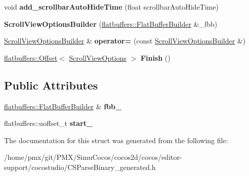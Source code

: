 \begin{DoxyCompactItemize}
void {\bfseries add\+\_\+scrollbar\+Auto\+Hide\+Time} (float scrollbar\+Auto\+Hide\+Time)
\item 
\mbox{\label{structflatbuffers_1_1ScrollViewOptionsBuilder_ab09d1ce59f1a1773b275a2d74220109f}} 
{\bfseries Scroll\+View\+Options\+Builder} (\hyperlink{classflatbuffers_1_1FlatBufferBuilder}{flatbuffers\+::\+Flat\+Buffer\+Builder} \&\+\_\+fbb)
\item 
\mbox{\label{structflatbuffers_1_1ScrollViewOptionsBuilder_aefb873763bc0bb58d9aee1683e97774d}} 
\hyperlink{structflatbuffers_1_1ScrollViewOptionsBuilder}{Scroll\+View\+Options\+Builder} \& {\bfseries operator=} (const \hyperlink{structflatbuffers_1_1ScrollViewOptionsBuilder}{Scroll\+View\+Options\+Builder} \&)
\item 
\mbox{\label{structflatbuffers_1_1ScrollViewOptionsBuilder_a4cf1dc9c5a4b3e79ea56473508ccb354}} 
\hyperlink{structflatbuffers_1_1Offset}{flatbuffers\+::\+Offset}$<$ \hyperlink{structflatbuffers_1_1ScrollViewOptions}{Scroll\+View\+Options} $>$ {\bfseries Finish} ()
\end{DoxyCompactItemize}
\subsection*{Public Attributes}
\begin{DoxyCompactItemize}
\item 
\mbox{\label{structflatbuffers_1_1ScrollViewOptionsBuilder_adb1ecce5fced9a267732d1e7daec1011}} 
\hyperlink{classflatbuffers_1_1FlatBufferBuilder}{flatbuffers\+::\+Flat\+Buffer\+Builder} \& {\bfseries fbb\+\_\+}
\item 
\mbox{\label{structflatbuffers_1_1ScrollViewOptionsBuilder_a24620f5f79e0253f86283a58e2667f5a}} 
flatbuffers\+::uoffset\+\_\+t {\bfseries start\+\_\+}
\end{DoxyCompactItemize}


The documentation for this struct was generated from the following file\+:\begin{DoxyCompactItemize}
\item 
/home/pmx/git/\+P\+M\+X/\+Simu\+Cocos/cocos2d/cocos/editor-\/support/cocostudio/C\+S\+Parse\+Binary\+\_\+generated.\+h\end{DoxyCompactItemize}
